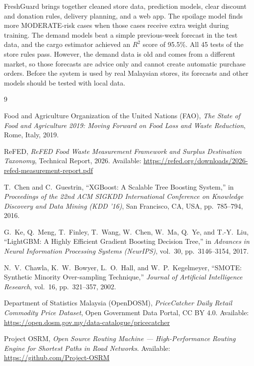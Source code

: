 \documentclass[12pt,a4paper]{article}
\renewcommand{\_}{\oldunderscore\allowbreak}
\begin{document}
FreshGuard brings together cleaned store data, prediction models, clear discount and donation rules, delivery planning, and a web app. The spoilage model finds more MODERATE-risk cases when those cases receive extra weight during training. The demand models beat a simple previous-week forecast in the test data, and the cargo estimator achieved an $R^2$ score of 95.5\%. All 45 tests of the store rules pass. However, the demand data is old and comes from a different market, so those forecasts are advice only and cannot create automatic purchase orders. Before the system is used by real Malaysian stores, its forecasts and other models should be tested with local data.

\begin{thebibliography}{9}

Food and Agriculture Organization of the United Nations (FAO), \emph{The State of Food and Agriculture 2019: Moving Forward on Food Loss and Waste Reduction}, Rome, Italy, 2019.

ReFED, \emph{ReFED Food Waste Measurement Framework and Surplus Destination Taxonomy}, Technical Report, 2026. Available: \url{https://refed.org/downloads/2026-refed-measurement-report.pdf}

T.~Chen and C.~Guestrin, ``XGBoost: A Scalable Tree Boosting System,'' in \emph{Proceedings of the 22nd ACM SIGKDD International Conference on Knowledge Discovery and Data Mining (KDD '16)}, San Francisco, CA, USA, pp.~785--794, 2016.

G.~Ke, Q.~Meng, T.~Finley, T.~Wang, W.~Chen, W.~Ma, Q.~Ye, and T.-Y.~Liu, ``LightGBM: A Highly Efficient Gradient Boosting Decision Tree,'' in \emph{Advances in Neural Information Processing Systems (NeurIPS)}, vol.~30, pp.~3146--3154, 2017.

N.~V.~Chawla, K.~W.~Bowyer, L.~O.~Hall, and W.~P.~Kegelmeyer, ``SMOTE: Synthetic Minority Over-sampling Technique,'' \emph{Journal of Artificial Intelligence Research}, vol.~16, pp.~321--357, 2002.

Department of Statistics Malaysia (OpenDOSM), \emph{PriceCatcher Daily Retail Commodity Price Dataset}, Open Government Data Portal, CC BY 4.0. Available: \url{https://open.dosm.gov.my/data-catalogue/pricecatcher}

Project OSRM, \emph{Open Source Routing Machine --- High-Performance Routing Engine for Shortest Paths in Road Networks}. Available: \url{https://github.com/Project-OSRM}

\end{thebibliography}
\end{document}

